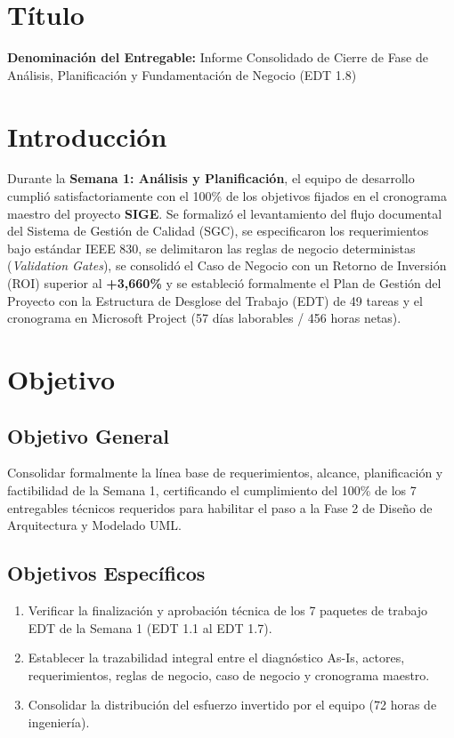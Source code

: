 \documentclass[12pt,a4paper]{article}
\begin{document}
\section{Título}
\textbf{Denominación del Entregable:} Informe Consolidado de Cierre de Fase de Análisis, Planificación y Fundamentación de Negocio (EDT 1.8)



\section{Introducción}
Durante la \textbf{Semana 1: Análisis y Planificación}, el equipo de desarrollo cumplió satisfactoriamente con el 100\% de los objetivos fijados en el cronograma maestro del proyecto \textbf{SIGE}. Se formalizó el levantamiento del flujo documental del Sistema de Gestión de Calidad (SGC), se especificaron los requerimientos bajo estándar IEEE 830, se delimitaron las reglas de negocio deterministas (\textit{Validation Gates}), se consolidó el Caso de Negocio con un Retorno de Inversión (ROI) superior al \textbf{+3,660\%} y se estableció formalmente el Plan de Gestión del Proyecto con la Estructura de Desglose del Trabajo (EDT) de 49 tareas y el cronograma en Microsoft Project (57 días laborables / 456 horas netas).

\section{Objetivo}

\subsection{Objetivo General}
Consolidar formalmente la línea base de requerimientos, alcance, planificación y factibilidad de la Semana 1, certificando el cumplimiento del 100\% de los 7 entregables técnicos requeridos para habilitar el paso a la Fase 2 de Diseño de Arquitectura y Modelado UML.

\subsection{Objetivos Específicos}
\begin{enumerate}[leftmargin=1.5em, itemsep=2pt, topsep=2pt]
    \item Verificar la finalización y aprobación técnica de los 7 paquetes de trabajo EDT de la Semana 1 (EDT 1.1 al EDT 1.7).
    \item Establecer la trazabilidad integral entre el diagnóstico As-Is, actores, requerimientos, reglas de negocio, caso de negocio y cronograma maestro.
    \item Consolidar la distribución del esfuerzo invertido por el equipo (72 horas de ingeniería).
\end{enumerate}
\end{document}
